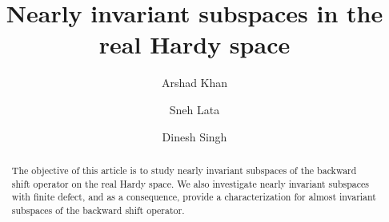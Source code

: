 \documentclass[11pt]{amsart}
\numberwithin{equation}{section}
\begin{document}
\title[]{Nearly invariant subspaces in the real Hardy space}

\author{Arshad Khan}
\address{Department Of Mathematics\\
         School of Natural Sciences\\
        Shiv Nadar Institution Of Eminence\\
        Gautam Buddha Nagar - 201314\\
         Uttar Pradesh, India}

\author{Sneh Lata}
\address{Department Of Mathematics\\
         School of Natural Sciences\\
         Shiv Nadar Institution Of Eminence\\
         Gautam Buddha Nagar - 201314\\
         Uttar Pradesh, India}

\author{ Dinesh Singh}
\address{Centre For Digital Sciences\\
      O. P. Jindal Global University\\
   Sonipat\\
        Haryana 131001, India}




\begin{abstract}
The objective of this article is to study nearly invariant subspaces of the backward shift operator on the real Hardy space. We also investigate nearly invariant subspaces with finite defect, and as a consequence, provide a characterization for almost invariant subspaces of the backward shift operator.
\end{abstract}

\maketitle
\end{document}

